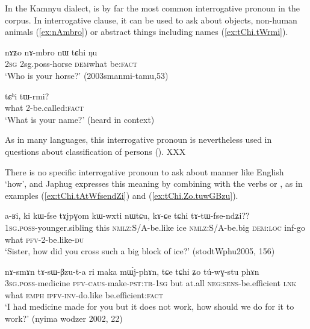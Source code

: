 In the Kamnyu dialect,  is by far the most common interrogative pronoun in the corpus. In interrogative clause, it can be used to ask about objects, non-human animals (\ref{ex:nAmbro}) or abstract things including names (\ref{ex:tChi.tWrmi}).

\begin{exe}
\ex \label{ex:nAmbro}
\gll
nɤʑo nɤ-mbro nɯ tɕhi ŋu \\
\textsc{2sg} 2sg.poss-horse \textsc{dem}what be:\textsc{fact} \\
\glt `Who is your horse?' (2003smanmi-tamu,53)
\end{exe}  

\begin{exe}
\ex \label{ex:tChi.tWrmi}
\gll tɕʰi tɯ-rmi? \\
what 2-be.called:\textsc{fact} \\
\glt `What is your name?' (heard in context)
\end{exe}  

As in many languages, this interrogative pronoun is nevertheless used in questions about classification of persons (\citealt{idiatov07nonselective}). XXX

There is no specific interrogative pronoun to ask about manner like English `how', and Japhug expresses this meaning by combining  with the verbs  or , as in examples (\ref{ex:tChi.tAtWfsendZi}) and (\ref{ex:tChi.Zo.tuwGBzu}).

\begin{exe}
\ex \label{ex:tChi.tAtWfsendZi}
\gll a-ʁi, ki kɯ-fse tɤjpɣom kɯ-wxti nɯtɕu, kɤ-ɕe tɕhi tɤ-tɯ-fse-ndʑi?? \\
\textsc{1sg.poss}-younger.sibling this \textsc{nmlz}:S/A-be.like ice \textsc{nmlz}:S/A-be.big \textsc{dem:loc} inf-go what \textsc{pfv}-2-be.like-\textsc{du} \\
\glt `Sister, how did you cross such a big block of ice?' (stodtWphu2005, 156)
\end{exe}  

\begin{exe}
\ex \label{ex:tChi.Zo.tuwGBzu}
\gll nɤ-smɤn tɤ-sɯ-βzu-t-a ri maka mɯ́j-phɤn, tɕe tɕhi ʑo tú-wɣ-stu phɤn \\
\textsc{3sg.poss}-medicine \textsc{pfv-caus}-make-\textsc{pst:tr-1sg} but at.all \textsc{neg:sens}-be.efficient \textsc{lnk} what \textsc{emph} \textsc{ipfv-inv}-do.like be.efficient:\textsc{fact} \\
\glt `I had medicine made for you but it does not work, how should we do for it to work?' (nyima wodzer 2002, 22) 
\end{exe}  

